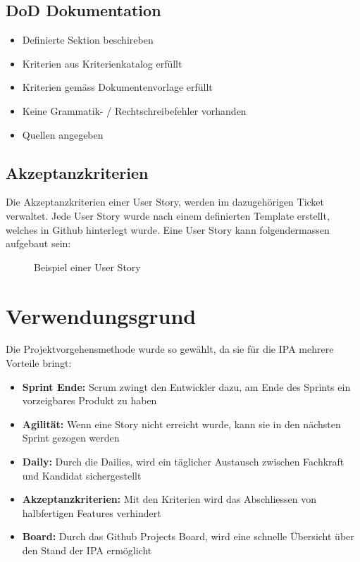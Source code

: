 \newpage

\subsection{DoD Dokumentation}

\begin{itemize}
    \item Definierte Sektion beschireben
    \item Kriterien aus Kriterienkatalog erfüllt
    \item Kriterien gemäss Dokumentenvorlage erfüllt
    \item Keine Grammatik- / Rechtschreibefehler vorhanden
    \item Quellen angegeben
\end{itemize}

\subsection{Akzeptanzkriterien}
Die Akzeptanzkriterien einer User Story, werden im dazugehörigen Ticket verwaltet. Jede User Story wurde nach einem definierten Template
erstellt, welches in Github hinterlegt wurde. Eine User Story kann folgendermassen aufgebaut sein:

\begin{figure}[h]
    \centering
    \caption{Beispiel einer User Story}
\end{figure}

\newpage

\section{Verwendungsgrund}
Die Projektvorgehensmethode wurde so gewählt, da sie für die IPA mehrere Vorteile bringt:

\begin{itemize}
    \item \textbf{Sprint Ende:} Scrum zwingt den Entwickler dazu, am Ende des Sprints ein vorzeigbares Produkt zu haben
    \item \textbf{Agilität:} Wenn eine Story nicht erreicht wurde, kann sie in den nächsten Sprint gezogen werden
    \item \textbf{Daily:} Durch die Dailies, wird ein täglicher Austausch zwischen Fachkraft und Kandidat sichergestellt
    \item \textbf{Akzeptanzkriterien:} Mit den Kriterien wird das Abschliessen von halbfertigen Features verhindert
    \item \textbf{Board:} Durch das Github Projects Board, wird eine schnelle Übersicht über den Stand der IPA ermöglicht
\end{itemize}

